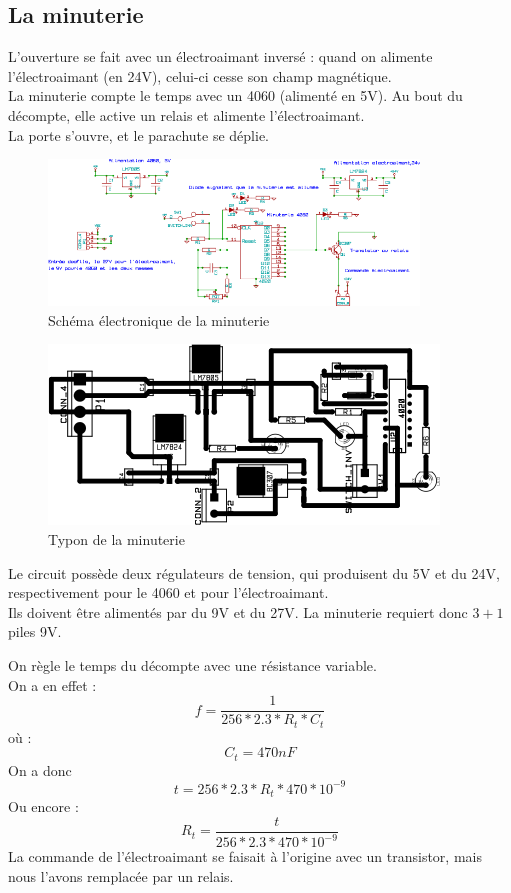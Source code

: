 \documentclass[a4paper,12pt]{scrartcl}
\begin{document}
	   \subsection{La minuterie}
		L'ouverture se fait avec un électroaimant inversé : quand on alimente l'électroaimant (en 24V), celui-ci cesse son champ magnétique.\\
		La minuterie compte le temps avec un 4060 (alimenté en 5V). Au bout du décompte, elle active un relais et alimente l'électroaimant.\\
		La porte s'ouvre, et le parachute se déplie.
	      \begin{figure}[H]
		    \begin{center}
		      \caption{ Schéma électronique de la minuterie }
		      \includegraphics[height=147px, width=372px]{Photos_Mercury/4060.png}
		    \end{center}
	      \end{figure}
	      \begin{figure}[H]
		    \begin{center}
		      \caption{ Typon de la minuterie }
		      \includegraphics[height=181px, width=392px]{Photos_Mercury/4060-brd.png}
		    \end{center}
	      \end{figure}
		   Le circuit possède deux régulateurs de tension, qui produisent du 5V et du 24V, respectivement pour le 4060 et pour l'électroaimant.\\
		   Ils doivent être alimentés par du 9V et du 27V.
		   La minuterie requiert donc $3+1$ piles 9V.
		  
		   On règle le temps du décompte avec une résistance variable.\\
		   On a en effet : 
		    $$ f = \frac{1}{256 * 2.3 * R_t*C_t}$$
		   où : 
		    $$ C_t = 470 nF$$
		   On a donc 
		    $$ t = 256 * 2.3 * R_t * 470*10^{-9} $$
		   Ou encore : 
		    $$ R_t = \frac{t}{256 * 2.3 * 470 * 10^{-9}}$$
		   La commande de l'électroaimant se faisait à l'origine avec un transistor, mais nous l'avons remplacée par un relais.
\end{document}
